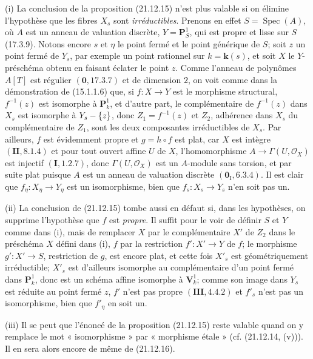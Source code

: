 \begin{remarks}[21.12.17]
\label{IV.21.12.17}
(i) La conclusion de la proposition (21.12.15) n'est plus valable si on élimine
l'hypothèse que les fibres $X_s$ sont \emph{irréductibles}. Prenons en effet
$S=\operatorname{Spec}(A)$, où $A$ est un anneau de valuation discrète,
$Y=\mathbf P^1_S$, qui est propre et lisse sur $S$ (17.3.9). Notons encore $s$ et
$\eta$ le point fermé et le point générique de $S$; soit $z$ un point fermé de $Y_s$,
par exemple un point rationnel sur $k=\boldsymbol{k}(s)$, et soit $X$ le $Y$-préschéma obtenu en
faisant éclater le point $z$. Comme l'anneau de polynômes $A[T]$ est régulier
$(\mathbf 0, 17.3.7)$ et de dimension $2$, on voit comme dans la démonstration de
(15.1.1.6) que, si $f:X\to Y$ est le morphisme structural, $f^{-1}(z)$ est isomorphe
à $\mathbf P^1_k$, et d'autre part, le complémentaire de $f^{-1}(z)$ dans $X_s$ est
isomorphe à $Y_s-\{z\}$, donc $Z_1=f^{-1}(z)$ et $Z_2$, adhérence dans $X_s$ du
complémentaire de $Z_1$, sont les deux composantes irréductibles de $X_s$. Par
ailleurs, $f$ est évidemment propre et $g=h\circ f$ est plat, car $X$ est intègre
$(\mathbf{II}, 8.1.4)$ et pour tout ouvert affine $U$ de $X$, l'homomorphisme
$A\to\Gamma(U,\mathcal O_X)$ est injectif $(\mathbf I, 1.2.7)$, donc
$\Gamma(U,\mathcal O_X)$ est un $A$-module sans torsion, et par suite plat puisque $A$
est un anneau de valuation discrète $(\mathbf 0_{\mathrm I}, 6.3.4)$. Il est clair que
$f_\eta:X_\eta\to Y_\eta$ est un isomorphisme, bien que
$f_s:X_s\to Y_s$ n'en soit pas un.

(ii) La conclusion de (21.12.15) tombe aussi en défaut si, dans les hypothèses, on
supprime l'hypothèse que $f$ est \emph{propre}. Il suffit pour le voir de définir $S$ et
$Y$ comme dans (i), mais de remplacer $X$ par le complémentaire $X'$ de $Z_2$ dans le
préschéma $X$ défini dans (i), $f$ par la restriction $f':X'\to Y$ de $f$; le morphisme
$g':X'\to S$, restriction de $g$, est encore plat, et cette fois $X'_s$ est
géométriquement irréductible; $X'_s$ est d'ailleurs isomorphe au complémentaire d'un
point fermé dans $\mathbf P^1_k$, donc est un schéma affine isomorphe à $\mathbf V^1_k$;
comme son image dans $Y_s$ est réduite au point fermé $z$, $f'$ n'est pas propre
$(\mathbf{III}, 4.4.2)$ et $f'_s$ n'est pas un isomorphisme, bien que $f'_\eta$ en soit
un.

(iii) Il se peut que l'énoncé de la proposition (21.12.15) reste valable quand on y
remplace le mot « isomorphisme » par « morphisme étale » (cf. (21.12.14, (v))). Il en
sera alors encore de même de (21.12.16).
\end{remarks}
